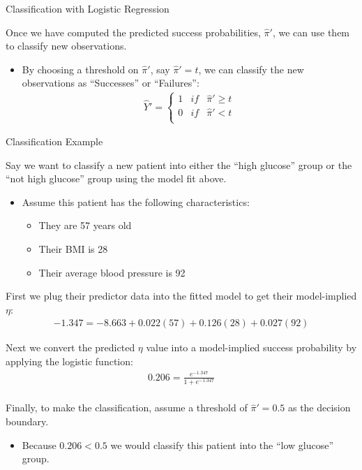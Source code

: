 \documentclass{beamer}\usepackage[]{graphicx}\usepackage[]{color}
\begin{document}
\begin{frame}{Classification with Logistic Regression}
  
  Once we have computed the predicted success probabilities, $\hat{\pi}'$, we 
  can use them to classify new observations.
  \vb
  \begin{itemize}
  \item By choosing a threshold on $\hat{\pi}'$, say $\hat{\pi}' = t$, we can 
    classify the new observations as ``Successes'' or ``Failures'':
    \begin{align*}
      \hat{Y}' = \left\{ 
      \begin{array}{ccc}
        1 & if & \hat{\pi}' \geq t\\
        0 & if & \hat{\pi}' < t\\
      \end{array}
      \right.
    \end{align*}
    
  \end{itemize}
  
\end{frame}


\begin{frame}[allowframebreaks]{Classification Example}
  


Say we want to classify a new patient into either the ``high glucose'' group 
or the ``not high glucose'' group using the model fit above.
\vb
\begin{itemize}
\item Assume this patient has the following characteristics:
  \vb
  \begin{itemize}
  \item They are 57 years old
    \vc
  \item Their BMI is 28
    \vc
  \item Their average blood pressure is 92
  \end{itemize}
\end{itemize}
\vb
First we plug their predictor data into the fitted model to get their 
model-implied $\eta$:
\begin{align*}
  -1.347 = -8.663 + 0.022 (57) + 0.126 (28) + 
  0.027 (92)
\end{align*}

\pagebreak

Next we convert the predicted $\eta$ value into a model-implied success
probability by applying the logistic function:
\begin{align*}
  0.206 = \frac{e^{-1.347}}{1 + e^{-1.347}}
\end{align*}\\
\va
Finally, to make the classification, assume a threshold of $\hat{\pi}' = 0.5$ as 
the decision boundary.
\vb
\begin{itemize}
\item Because $0.206 < 0.5$ we would 
  classify this patient into the ``low glucose'' 
  group.
\end{itemize}

\end{frame}
   
\end{document}
